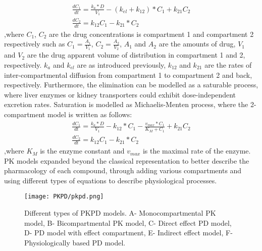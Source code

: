 \begin{equation} 
\begin{gathered}
\frac{dC_{1}}{dt}=\frac{k_{a}*D}{V_{1}}-(k_{el}+k_{12})*C_{1}+k_{21}C_{2} \\
\frac{dC_{2}}{dt}=k_{12}C_{1}-k_{21}*C_{2}
\end{gathered}
\end{equation}
,where $C_{1}$, $C_{2}$ are the drug concentrations is compartment 1 and compartment 2 respectively such as $C_{1}=\frac{A_{1}}{V_{1}}$, $C_{2}=\frac{A_{2}}{V_{2}}$, $A_{1}$ and $A_{2}$ are the amounts of drug, $V_{1}$ and $V_{2}$ are the drug apparent volume of distribution in compartment 1 and 2, respectively. $k_{a}$ and $k_{el}$ are as introduced previously, $k_{12}$ and $k_{21}$ are the rates of inter-compartmental diffusion from compartment 1 to compartment 2 and back, respectively. Furthermore, the elimination can be modelled as a saturable process, where liver enzymes or kidney transporters could exhibit dose-independent excretion rates. Saturation is modelled as Michaelis-Menten process, where the 2-compartment model is written as follows:
\begin{equation} 
\begin{gathered}
\frac{dC_{1}}{dt}=\frac{k_{a}*D}{V_{1}}-k_{12}*C_{1}-\frac{v_{max}*C_{1}}{K_{M}+C_{1}}+k_{21}C_{2} \\
\frac{dC_{2}}{dt}=k_{12}C_{1}-k_{21}*C_{2}
\end{gathered}
\end{equation}
,where $K_{M}$ is the enzyme constant and $v_{max}$ is the maximal rate of the enzyme.
PK models expanded beyond the classical representation to better describe the pharmacology of each compound, through adding various compartments and using different types of equations to describe physiological processes. 
\begin{figure}[!ht]
\centering
	\texttt{[image: PKPD/pkpd.png]}%
	\caption[Different types of PKPD models.]{Different types of PKPD models. A- Monocompartmental PK model, B- Bicompartmental PK model, C- Direct effect PD model, D- PD model with effect compartment, E- Indirect effect model, F- Physiologically based PD model.}
	\label{fig:pkpd}
\end{figure}
